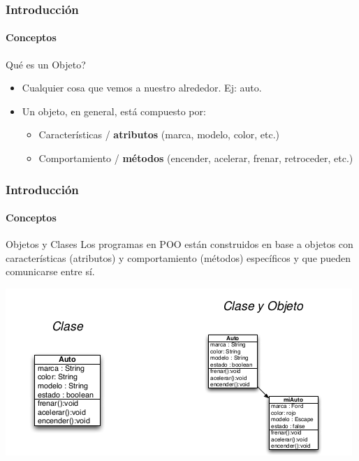 \documentclass{beamer}
\begin{document}
		\begin{frame}
			\frametitle{Introducci\'on}
			\framesubtitle{Conceptos}

			\begin{exampleblock}{Qu\'e es un Objeto?}
				\begin{itemize}
  					\item[] Cualquier cosa que vemos a nuestro alrededor. Ej: auto.
					\item[] Un objeto, en general, est\'a compuesto por:
					\begin{itemize}
  						\item Caracter\'isticas / \textbf{atributos} (marca, modelo, color, etc.)
  						\item Comportamiento / \textbf{m\'etodos} (encender, acelerar, frenar, retroceder, etc.)
  					\end{itemize}
				\end{itemize}
			\end{exampleblock}
		\end{frame}
		
		\begin{frame}
			\frametitle{Introducci\'on}
			\framesubtitle{Conceptos}

			\begin{exampleblock}{Objetos y Clases}
				Los programas en POO est\'an construidos en base a objetos con caracter\'isticas (atributos) y comportamiento (m\'etodos) espec\'ificos y que pueden comunicarse entre s\'i.
			\end{exampleblock}
			
			\begin{exampleblock}{}
				\begin{center}
					\includegraphics[scale=.5]{images/ClaseAuto.png}
				\end{center}
			\end{exampleblock}
		\end{frame}
\end{document}
